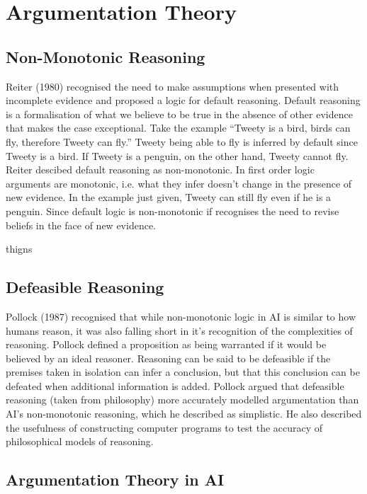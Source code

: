 \section{Argumentation Theory}

\subsection{Non-Monotonic Reasoning}


Reiter (1980) recognised the need to make assumptions when presented with incomplete evidence and proposed a logic for default reasoning. Default reasoning is a formalisation of what we believe to be true in the absence of other evidence that makes the case exceptional.
Take the example “Tweety is a bird, birds can fly, therefore Tweety can fly.” Tweety being able to fly is inferred by default since Tweety is a bird. If Tweety is a penguin, on the other hand, Tweety cannot fly. Reiter descibed default reasoning as non-monotonic. In first order logic arguments are monotonic, i.e. what they infer doesn’t change in the presence of new evidence. In the example just given, Tweety can still fly even if he is a penguin. Since default logic is non-monotonic if recognises the need to revise beliefs in the face of new evidence.

thigns
\subsection{Defeasible Reasoning}

Pollock (1987) recognised that while non-monotonic logic in AI is similar to how humans reason, it was also falling short in it’s recognition of the complexities of reasoning. Pollock defined a proposition as being warranted if it would be believed by an ideal reasoner. Reasoning can be said to be defeasible if the premises taken in isolation can infer a conclusion, but that this conclusion can be defeated when additional information is added. Pollock argued that defeasible reasoning (taken from philosophy) more accurately modelled argumentation than AI's non-monotonic reasoning, which he described as simplistic. He also described the usefulness of constructing computer programs to test the accuracy of philosophical models of reasoning.


\subsection{Argumentation Theory in AI}

